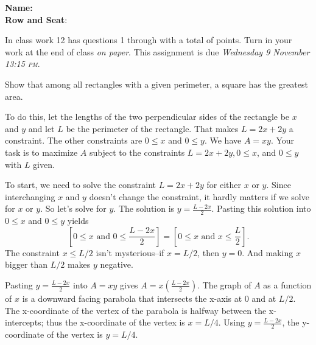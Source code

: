 \documentclass[12pt,fleqn,answers]{exam}
\newcommand\PM{\textsc{pm}}
\newcommand{\quiz}{12}
\newcommand{\term}{Fall}
\newcommand{\due}{Wednesday 9 November 13:15 \PM}
\newcommand{\class}{MATH 115}
\begin{document}
\large
\vspace{0.1in}
\noindent\makebox[3.0truein][l]{\textbf{\class}}
\textbf{Name:} \hrulefill \\
\noindent \makebox[3.0truein][l]{\textbf{In class work \quiz, \term \/ \the\year}}
\textbf{Row and Seat}:\hrulefill\\
\vspace{0.1in}


\noindent  In class work  \quiz\/  has questions 1 through  \numquestions \/ with a total of  \numpoints\/  points.   
Turn in your work at the end of class  \emph{on paper}. This assignment is due \emph{\due}.

\vspace{0.1in}


\begin{questions} 

    \question [5] Show that among all rectangles with a given perimeter,
    a square has the greatest area. 
    
    \quad To do this, let the lengths of the two perpendicular sides of the 
     rectangle be $x$ and $y$ and let $L$ be the perimeter of the
     rectangle. That makes $L = 2 x + 2 y$ a constraint. The other 
     constraints are $0 \leq x$ and $0 \leq y$.  We have $A = xy$.  Your task is to 
     maximize $A$ subject to the constraints $L = 2 x + 2 y, 0 \leq x$,
     and $0 \leq y$ with $L$  given.
     
     \begin{solution} To start, we need to solve the constraint
        $L = 2 x + 2 y$ for either $x$ or $y$. Since interchanging
        $x$ and $y$ doesn't change the constraint, it hardly matters
        if we solve for $x$ or $y$. So let's solve for $y$. 
        The solution is $y =\frac{L - 2 x}{2}$.  Pasting this 
        solution into $0 \leq x$ and $0 \leq y$ yields
        \begin{equation*}
           \left [ 0 \leq x \mbox{ and } 0 \leq\frac{L - 2 x}{2}
           \right ] = \left [ 0 \leq x \mbox{ and } x \leq \frac{L}{2}
           \right ].
        \end{equation*}
        The constraint $x \leq L/2$ isn't mysterious--if $x = L/2$, then
        $y=0$. And making $x$ bigger than $L/2$ makes $y$ negative.

        \quad Pasting $y =\frac{L - 2 x}{2}$ into $A = xy$ gives 
     $A = x (\frac{L - 2 x}{2})$.  The graph of $A$ as a function of $x$ is a downward facing parabola that intersects the x-axis at $0$ and at $L/2$.
     The x-coordinate of the vertex of the parabola is halfway between the x-intercepts; thus the x-coordinate of the vertex is $x = L/4$.  Using
     $y =\frac{L - 2 x}{2}$, the y-coordinate of the vertex is $y = L/4$. 
     

\end{solution}
\end{questions}
\end{document}
